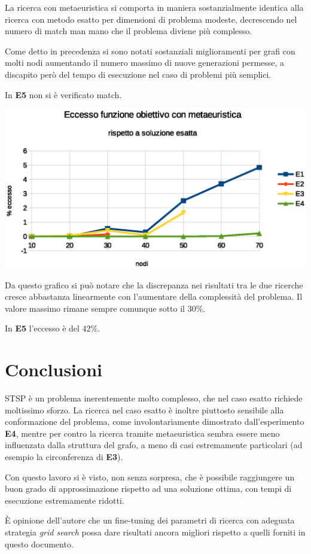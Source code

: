 \documentclass[a4paper]{article}
\begin{document}
                    La ricerca con metaeuristica si comporta in maniera sostanzialmente identica alla ricerca con metodo esatto per dimensioni di problema modeste,
                    decrescendo nel numero di match man mano che il problema diviene pi\`u complesso.
                    
                    Come detto in precedenza si sono notati sostanziali miglioramenti per grafi con molti nodi aumentando il numero massimo di nuove generazioni permesse, a discapito per\`o
                    del tempo di esecuzione nel caso di problemi pi\`u semplici.

                    In \textbf{E5} non si \`e verificato match.

                    \includegraphics[scale=0.7]{img/excess}

                    Da questo grafico si pu\`o notare che la discrepanza nei risultati tra le due ricerche cresce abbastanza linearmente
                    con l'aumentare della complessit\`a del problema.
                    Il valore massimo rimane sempre comunque sotto il $30\%$.


                    In \textbf{E5} l'eccesso \`e del $42\%$.

    \section{Conclusioni}
        STSP \`e un problema inerentemente molto complesso, che nel caso esatto richiede moltissimo sforzo.
        La ricerca nel caso esatto \`e inoltre piuttosto sensibile alla conformazione del problema, come involontariamente dimostrato
        dall'esperimento \textbf{E4}, mentre per contro la ricerca tramite metaeuristica sembra essere meno influenzata dalla struttura del grafo,
        a meno di casi estremamente particolari (ad esempio la circonferenza di \textbf{E3}).

        Con questo lavoro si \`e visto, non senza sorpresa, che \`e possibile raggiungere un buon grado di approssimazione rispetto ad una
        soluzione ottima, con tempi di esecuzione estremamente ridotti.

        \`E opinione dell'autore che un fine-tuning dei parametri di ricerca con adeguata strategia \emph{grid search} possa dare risultati
        ancora migliori rispetto a quelli forniti in questo documento.
\end{document}
